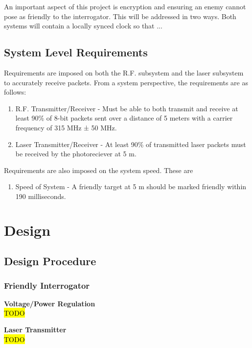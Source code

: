 \documentclass[letterpaper,10pt]{article}
\begin{document}
\begin{spacing}{1.15}
An important aspect of this project is encryption and ensuring an enemy cannot pose as friendly to the interrogator. This will be addressed in two ways. Both systems will contain a locally synced clock so that ...


\subsection{System Level Requirements}
Requirements are imposed on both the R.F. subsystem and the laser subsystem to accurately receive packets. From a system perspective, the requirements are as follows:
\begin{enumerate}
	\item R.F. Transmitter/Receiver - Must be able to both transmit and receive at least 90\% of 8-bit packets sent over a distance of 5 meters with a carrier frequency of 315 MHz ± 50 MHz.
	\item Laser Transmitter/Receiver - At least 90\% of transmitted laser packets must be received by the photoreciever at 5 m.
\end{enumerate}

Requirements are also imposed on the system speed. These are 
\begin{enumerate}
	\item Speed of System - A friendly target at 5 m should be marked friendly within 190 milliseconds.
\end{enumerate}




\section{Design}

\subsection{Design Procedure} 
\subsubsection{Friendly Interrogator}
\hspace{5mm}\textbf{Voltage/Power Regulation} \label{section:interrogator-voltage-regulation-design-procedure}
\\ \hl{TODO}

\hspace{5mm}\textbf{Laser Transmitter} \label{section:laser-transmitter-design-procedure}
\\ \hl{TODO}


\end{spacing}
\end{document}
